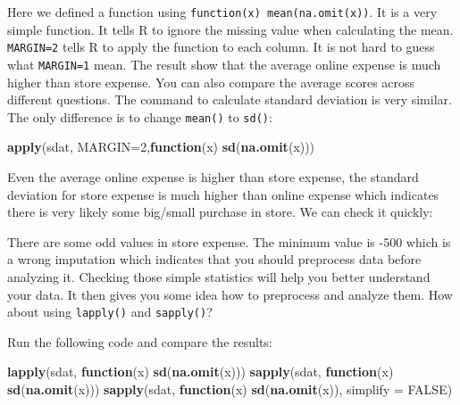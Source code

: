 \documentclass[12pt,]{krantz}
\makeatletter
\newenvironment{Shaded}{\begin{snugshade}}{\end{snugshade}}
\newcommand{\KeywordTok}[1]{\textcolor[rgb]{0.27,0.27,0.27}{\textbf{#1}}}
\newcommand{\DataTypeTok}[1]{\textcolor[rgb]{0.27,0.27,0.27}{#1}}
\newcommand{\DecValTok}[1]{\textcolor[rgb]{0.06,0.06,0.06}{#1}}
\newcommand{\OtherTok}[1]{\textcolor[rgb]{0.37,0.37,0.37}{#1}}
\newcommand{\ControlFlowTok}[1]{\textcolor[rgb]{0.27,0.27,0.27}{\textbf{#1}}}
\newcommand{\OperatorTok}[1]{\textcolor[rgb]{0.43,0.43,0.43}{\textbf{#1}}}
\newcommand{\NormalTok}[1]{#1}
\newenvironment{kframe}{%
\medskip{}
\setlength{\fboxsep}{.8em}
 \def\at@end@of@kframe{}%
 \ifinner\ifhmode%
  \def\at@end@of@kframe{\end{minipage}}%
  \begin{minipage}{\columnwidth}%
 \fi\fi%
 \def\FrameCommand##1{\hskip\@totalleftmargin \hskip-\fboxsep
 \colorbox{shadecolor}{##1}\hskip-\fboxsep
     \hskip-\linewidth \hskip-\@totalleftmargin \hskip\columnwidth}%
 \MakeFramed {\advance\hsize-\width
   \@totalleftmargin\z@ \linewidth\hsize
   \@setminipage}}%
 {\par\unskip\endMakeFramed%
 \at@end@of@kframe}
\renewenvironment{Shaded}{\begin{kframe}}{\end{kframe}}
\theoremstyle{definition}
\theoremstyle{definition}
\theoremstyle{definition}
\theoremstyle{remark}
\makeatother
\begin{document}
Here we defined a function using \texttt{function(x)\ mean(na.omit(x))}.
It is a very simple function. It tells R to ignore the missing value
when calculating the mean. \texttt{MARGIN=2} tells R to apply the
function to each column. It is not hard to guess what \texttt{MARGIN=1}
mean. The result show that the average online expense is much higher
than store expense. You can also compare the average scores across
different questions. The command to calculate standard deviation is very
similar. The only difference is to change \texttt{mean()} to
\texttt{sd()}:

\begin{Shaded}
\begin{Highlighting}[]
\KeywordTok{apply}\NormalTok{(sdat, }\DataTypeTok{MARGIN=}\DecValTok{2}\NormalTok{,}\ControlFlowTok{function}\NormalTok{(x) }\KeywordTok{sd}\NormalTok{(}\KeywordTok{na.omit}\NormalTok{(x)))}
\end{Highlighting}
\end{Shaded}

Even the average online expense is higher than store expense, the
standard deviation for store expense is much higher than online expense
which indicates there is very likely some big/small purchase in store.
We can check it quickly:

\begin{Shaded}
\end{Shaded}

There are some odd values in store expense. The minimum value is -500
which is a wrong imputation which indicates that you should preprocess
data before analyzing it. Checking those simple statistics will help you
better understand your data. It then gives you some idea how to
preprocess and analyze them. How about using \texttt{lapply()} and
\texttt{sapply()}?

Run the following code and compare the results:

\begin{Shaded}
\begin{Highlighting}[]
\KeywordTok{lapply}\NormalTok{(sdat, }\ControlFlowTok{function}\NormalTok{(x) }\KeywordTok{sd}\NormalTok{(}\KeywordTok{na.omit}\NormalTok{(x)))}
\KeywordTok{sapply}\NormalTok{(sdat, }\ControlFlowTok{function}\NormalTok{(x) }\KeywordTok{sd}\NormalTok{(}\KeywordTok{na.omit}\NormalTok{(x)))}
\KeywordTok{sapply}\NormalTok{(sdat, }\ControlFlowTok{function}\NormalTok{(x) }\KeywordTok{sd}\NormalTok{(}\KeywordTok{na.omit}\NormalTok{(x)), }\DataTypeTok{simplify =} \OtherTok{FALSE}\NormalTok{)}
\end{Highlighting}
\end{Shaded}
\end{document}
